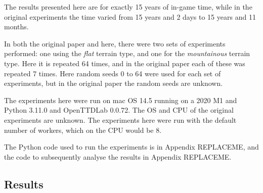 \documentclass[logo,msc,dsti]{infthesis}    %
\begin{document}
The results presented here are for exactly 15 years of in-game time, while in the original experiments the time varied from 15 years and 2 days to 15 years and 11 months.

In both the original paper and here, there were two sets of experiments performed: one using the \emph{flat} terrain type, and one for the \emph{mountainous} terrain type. Here it is repeated 64 times, and in the original paper each of these was repeated 7 times. Here random seeds 0 to 64 were used for each set of experiments, but in the original paper the random seeds are unknown.

The experiments here were run on mac OS 14.5 running on a 2020 M1 and Python 3.11.0 and OpenTTDLab 0.0.72. The OS and CPU of the original experiments are unknown. The experiments here were run with the default number of workers, which on the CPU would be 8.

The Python code used to run the experiments is in Appendix REPLACEME, and the code to subsequently analyse the results in Appendix REPLACEME.

\subsection{Results}
\end{document}
